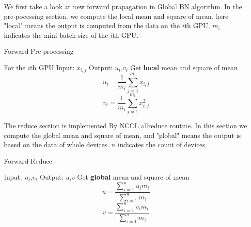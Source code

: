 We first take a look at new forward prapagation in Global BN algorithm. In the pre-pocessing section, we compute the local mean and square of mean, here "local" means the output is computed from the data on the $i$th GPU, $m_i$ indicates the mini-batch size of the $i$th GPU. 
\begin{algorithm}[h]
    \caption{Forward Pre-processing}
    \label{alg:forward-pre}
    \begin{algorithmic}[1]
        \State For the $i$th GPU
        \State Input: $x_{i,j}$
        \State Output: $u_{i}$,$v_{i}$
        \State Get \textbf{local} mean and square of mean
        \begin{equation}
            {u_i} = \frac{1}{{{m_i}}}\sum\limits_{j = 1}^{{m_i}} {{x_{i,j}}} 
        \end{equation}
        \begin{equation}
            {v_i} = \frac{1}{{{m_i}}}\sum\limits_{j = 1}^{{m_i}} {x_{i,j}^2} 
        \end{equation}
    \end{algorithmic}
\end{algorithm}


The reduce section is implemented By NCCL allreduce routine. In this section we compute the global mean and square of mean, and "global" means the output is based on the data of whole devices. $n$ indicates the count of devices.

\begin{algorithm}[h]
\caption{Forward Reduce} %
\label{alg:forward-reduce}

\begin{algorithmic}[1]
\State Input: $u_{i}$,$v_{i}$
\State Output: $u$,$v$
\State Get \textbf{global} mean and square of mean
\begin{equation}
    {u = \frac{{\sum\nolimits_{i = 1}^n {{u_i}{m_i}} }}{{\sum\nolimits_{i = 1}^n {{m_i}} }}}
\end{equation}
\begin{equation}
    {v = \frac{{\sum\nolimits_{i = 1}^n {{v_i}{m_i}} }}{{\sum\nolimits_{i = 1}^n {{m_i}} }}}
\end{equation}
\end{algorithmic}
\end{algorithm}

